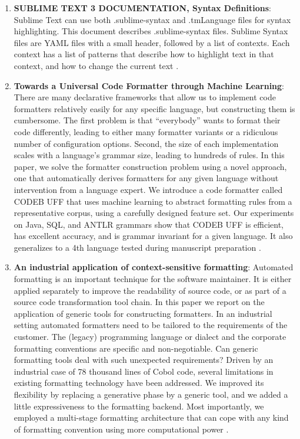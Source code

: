 \begin{englishtext}
\begin{enumerate}
    \item \textbf{SUBLIME TEXT 3 DOCUMENTATION, Syntax Definitions}: Sublime
    Text can use both .sublime-syntax and .tmLanguage files for syntax
    highlighting. This document describes .sublime-syntax files. Sublime Syntax
    files are YAML files with a small header, followed by a list of contexts.
    Each context has a list of patterns that describe how to highlight text in
    that context, and how to change the current text \cite{Skinner}.

    \item \textbf{Towards a Universal Code Formatter through Machine Learning}:
    There are many declarative frameworks that allow us to implement code
    formatters relatively easily for any specific language, but constructing
    them is cumbersome. The first problem is that “everybody” wants to format
    their code differently, leading to either many formatter variants or a
    ridiculous number of configuration options. Second, the size of each
    implementation scales with a language’s grammar size, leading to hundreds of
    rules. In this paper, we solve the formatter construction problem using a
    novel approach, one that automatically derives formatters for any given
    language without intervention from a language expert. We introduce a code
    formatter called CODEB UFF that uses machine learning to abstract formatting
    rules from a representative corpus, using a carefully designed feature set.
    Our experiments on Java, SQL, and ANTLR grammars show that CODEB UFF is
    efficient, has excellent accuracy, and is grammar invariant for a given
    language. It also generalizes to a 4th language tested during manuscript
    preparation \cite{universalCodeFormatter}.

    \item \textbf{An industrial application of context-sensitive formatting}:
    Automated formatting is an important technique for the software maintainer.
    It is either applied separately to improve the readability of source code,
    or as part of a source code transformation tool chain. In this paper we
    report on the application of generic tools for constructing formatters. In
    an industrial setting automated formatters need to be tailored to the
    requirements of the customer. The (legacy) programming language or dialect
    and the corporate formatting conventions are specific and non-negotiable.
    Can generic formatting tools deal with such unexpected requirements? Driven
    by an industrial case of 78 thousand lines of Cobol code, several
    limitations in existing formatting technology have been addressed. We
    improved its flexibility by replacing a generative phase by a generic tool,
    and we added a little expressiveness to the formatting backend. Most
    importantly, we employed a multi-stage formatting architecture that can cope
    with any kind of formatting convention using more computational power
    \cite{industrialApplication}.


\end{enumerate}
\end{englishtext}
